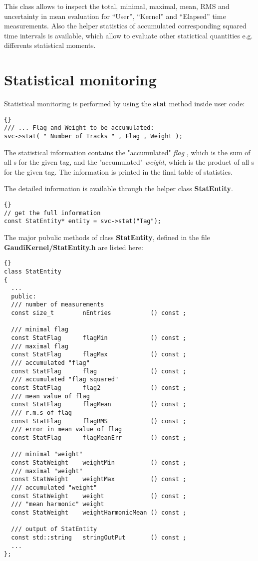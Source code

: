 \documentclass{lhcbnote}
\newcommand{\bftt}         {\ttfamily\bfseries}
\renewcommand{\it}         {\itshape}
\renewcommand{\tt}         {\ttfamily}
\begin{document}
This class allows to inspect the total, minimal, maximal, 
mean, RMS and uncertainty in mean evaluation 
for ``User'', ``Kernel'' and ``Elapsed'' time measurements. 
Also the helper statistics of accumulated corresponding 
squared time intervals  is available, which allow to evaluate
other statictical quantities e.g. differents statistical 
moments. 
 
\section{Statistical monitoring} 

Statistical monitoring is performed by using the {\bftt{stat}} method 
inside user code:
 
\begin{lstlisting}{}
/// ... Flag and Weight to be accumulated:
svc->stat( " Number of Tracks " , Flag , Weight ); 
\end{lstlisting} 

The statistical information contains the 
"accumulated" {\it flag }, which is the sum of all 
{\tt{Flag}}s for the given tag, and the 
"accumulated" {\it weight}, which is the product of all 
{\tt{Weight}}s for the given tag.   
The information is printed in the final table of 
statistics. 

The detailed information is available through 
the helper class {\bftt{StatEntity}}. 

\begin{lstlisting}{} 
// get the full information 
const StatEntity* entity = svc->stat("Tag");
\end{lstlisting} 

The major pubulic methods of class {\bftt{StatEntity}}, defined
in the file {\bftt{GaudiKernel/StatEntity.h}} are listed here:

\begin{lstlisting}{}
class StatEntity
{
  ...
  public:
  /// number of measurements  
  const size_t        nEntries           () const ;

  /// minimal flag
  const StatFlag      flagMin            () const ;
  /// maximal flag
  const StatFlag      flagMax            () const ;
  /// accumulated "flag"
  const StatFlag      flag               () const ;
  /// accumulated "flag squared"
  const StatFlag      flag2              () const ;
  /// mean value of flag 
  const StatFlag      flagMean           () const ; 
  /// r.m.s of flag 
  const StatFlag      flagRMS            () const ;
  /// error in mean value of flag 
  const StatFlag      flagMeanErr        () const ;

  /// minimal "weight"
  const StatWeight    weightMin          () const ;
  /// maximal "weight"
  const StatWeight    weightMax          () const ;
  /// accumulated "weight"
  const StatWeight    weight             () const ;
  /// "mean harmonic" weight 
  const StatWeight    weightHarmonicMean () const ;
  
  /// output of StatEntity 
  const std::string   stringOutPut       () const ;
  ...
};
\end{lstlisting}
\end{document}
